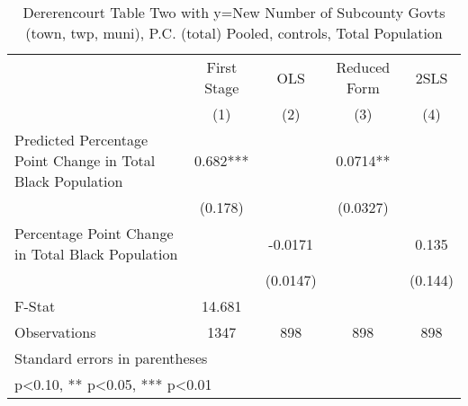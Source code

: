 \begin{table}[htbp]\centering
\def\sym#1{\ifmmode^{#1}\else\(^{#1}\)\fi}
\caption{Dererencourt Table Two with y=New Number of Subcounty Govts (town, twp, muni), P.C. (total)  Pooled,  controls, Total Population}
\begin{tabular}{l*{4}{c}}
\toprule
                    & First Stage   &         OLS   &Reduced Form   &        2SLS   \\
                    &\multicolumn{1}{c}{(1)}   &\multicolumn{1}{c}{(2)}   &\multicolumn{1}{c}{(3)}   &\multicolumn{1}{c}{(4)}   \\
\midrule
Predicted Percentage Point Change in Total Black Population&       0.682***&               &      0.0714** &               \\
                    &     (0.178)   &               &    (0.0327)   &               \\
\addlinespace
Percentage Point Change in Total Black Population&               &     -0.0171   &               &       0.135   \\
                    &               &    (0.0147)   &               &     (0.144)   \\
\midrule
F-Stat              &      14.681   &               &               &               \\
Observations        &        1347   &         898   &         898   &         898   \\
\bottomrule
\multicolumn{5}{l}{\footnotesize Standard errors in parentheses}\\
\multicolumn{5}{l}{\footnotesize * p<0.10, ** p<0.05, *** p<0.01}\\
\end{tabular}
\end{table}
